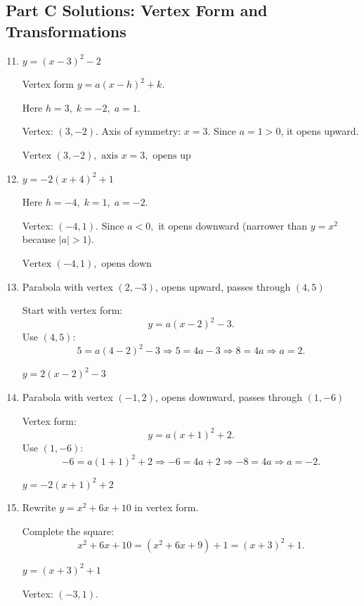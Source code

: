 \documentclass[14pt]{extarticle}
\begin{document}
\subsection*{Part C Solutions: Vertex Form and Transformations}
\begin{enumerate}
  \setcounter{enumi}{10}
  \item \(y = (x - 3)^2 - 2\)

  Vertex form \(y = a(x - h)^2 + k.\)

  Here \(h = 3,\; k = -2,\; a = 1.\)

  Vertex: \((3, -2)\).  
  Axis of symmetry: \(x = 3.\)  
  Since \(a = 1 > 0\), it opens upward.

  \(\boxed{\text{Vertex } (3, -2), \text{ axis } x = 3, \text{ opens up}}\)

  \item \(y = -2(x + 4)^2 + 1\)

  Here \(h = -4,\; k = 1,\; a = -2.\)

  Vertex: \((-4, 1).\)  
  Since \(a < 0,\) it opens downward (narrower than \(y = x^2\) because \(|a| > 1\)).

  \(\boxed{\text{Vertex } (-4, 1), \text{ opens down}}\)

  \item Parabola with vertex \((2, -3)\), opens upward, passes through \((4, 5)\)

  Start with vertex form:
  \[
  y = a(x - 2)^2 - 3.
  \]
  Use \((4, 5)\):
  \[
  5 = a(4 - 2)^2 - 3 \Rightarrow 5 = 4a - 3 \Rightarrow 8 = 4a \Rightarrow a = 2.
  \]

  \(\boxed{y = 2(x - 2)^2 - 3}\)

  \item Parabola with vertex \((-1, 2)\), opens downward, passes through \((1, -6)\)

  Vertex form:
  \[
  y = a(x + 1)^2 + 2.
  \]
  Use \((1, -6)\):
  \[
  -6 = a(1 + 1)^2 + 2 \Rightarrow -6 = 4a + 2 \Rightarrow -8 = 4a \Rightarrow a = -2.
  \]

  \(\boxed{y = -2(x + 1)^2 + 2}\)

  \item Rewrite \(y = x^2 + 6x + 10\) in vertex form.

  Complete the square:
  \[
  x^2 + 6x + 10 = (x^2 + 6x + 9) + 1 = (x + 3)^2 + 1.
  \]

  \(\boxed{y = (x + 3)^2 + 1}\)

  Vertex: \((-3, 1)\).
\end{enumerate}
\end{document}
